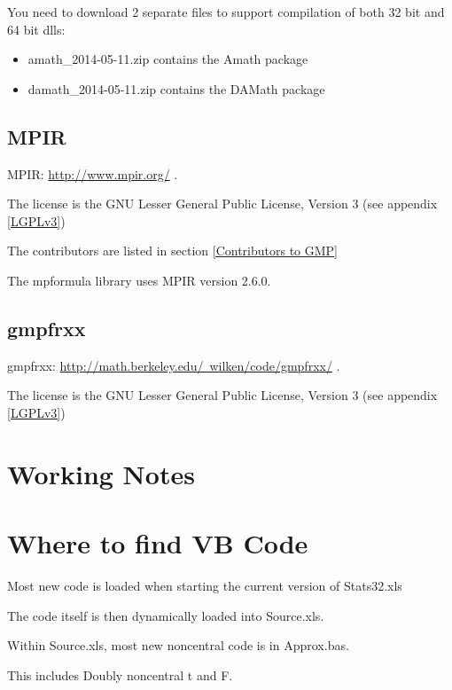 You need to download 2 separate files to support compilation of both 32 bit and 64 bit dlls:

\begin{itemize}
	\item amath\_2014-05-11.zip contains the Amath package
	\item damath\_2014-05-11.zip contains the DAMath package
\end{itemize}




\subsection{MPIR}
MPIR: \href{http://www.mpir.org/}{http://www.mpir.org/} . 

The license is the GNU Lesser General Public License, Version 3 (see appendix \ref{LGPLv3})

The contributors are listed in section \ref{Contributors to GMP}

The mpformula library uses MPIR version 2.6.0.



\subsection{gmpfrxx}
gmpfrxx: \href{http://math.berkeley.edu/~wilken/code/gmpfrxx/}{http://math.berkeley.edu/~wilken/code/gmpfrxx/} .

The license is the GNU Lesser General Public License, Version 3 (see appendix \ref{LGPLv3})

%

\section{Working Notes}

\section{Where to find VB Code}
Most new code is loaded when starting the current version of Stats32.xls

The code itself is then dynamically loaded into Source.xls.

Within Source.xls, most new noncentral code is in Approx.bas.

This includes Doubly noncentral t and F.

